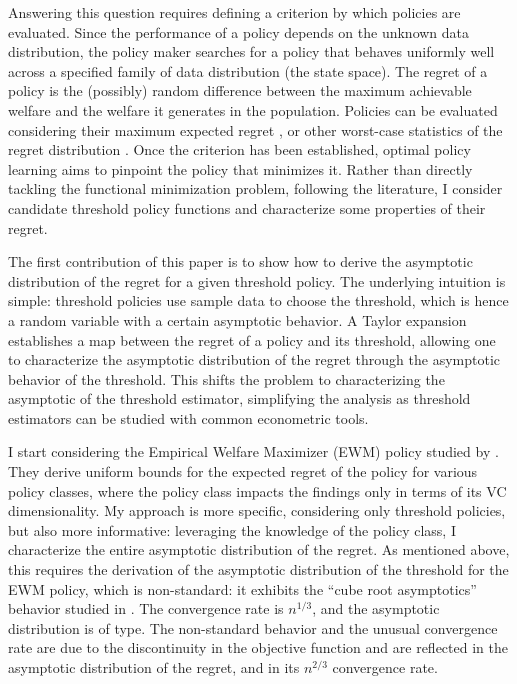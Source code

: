{Answering this question requires defining a criterion by which policies are evaluated. Since the performance of a policy depends on the unknown data distribution, the policy maker searches for a policy that behaves uniformly well across a specified family of data distribution (the state space). The regret of a policy is the (possibly) random difference between the maximum achievable welfare and the welfare it generates in the population. Policies can be evaluated considering their maximum expected regret \citep{manski2004statistical, hirano2009asymptotics, kitagawa2018should, athey2021policy, mbakop2021model, manski2023probabilistic}, or other worst-case statistics of the regret distribution \citep{manski2023statistical, kitagawa2022treatment}. Once the criterion has been established, optimal policy learning aims to pinpoint the policy that minimizes it. Rather than directly tackling the functional minimization problem, following the literature, I consider candidate threshold policy functions and characterize some properties of their regret.

The first contribution of this paper is to show how to derive the asymptotic distribution of the regret for a given threshold policy. The underlying intuition is simple: threshold policies use sample data to choose the threshold, which is hence a random variable with a certain asymptotic behavior. A Taylor expansion establishes a map between the regret of a policy and its threshold, allowing one to characterize the asymptotic distribution of the regret through the asymptotic behavior of the threshold. This shifts the problem to characterizing the asymptotic of the threshold estimator, simplifying the analysis as threshold estimators can be studied with common econometric tools.

I start considering the Empirical Welfare Maximizer (EWM) policy studied by \cite{kitagawa2018should}. They derive uniform bounds for the expected regret of the policy for various policy classes, where the policy class impacts the findings only in terms of its VC dimensionality. My approach is more specific, considering only threshold policies, but also more informative: leveraging the knowledge of the policy class, I characterize the entire asymptotic distribution of the regret. As mentioned above, this requires the derivation of the asymptotic distribution of the threshold for the EWM policy, which is non-standard: it exhibits the ``cube root asymptotics'' behavior studied in \cite{kim1990cube}. The convergence rate is $n^{1/3}$, and the asymptotic distribution is of \cite{chernoff1964estimation} type. The non-standard behavior and the unusual convergence rate are due to the discontinuity in the objective function and are reflected in the asymptotic distribution of the regret, and in its $n^{2/3}$ convergence rate.

}

